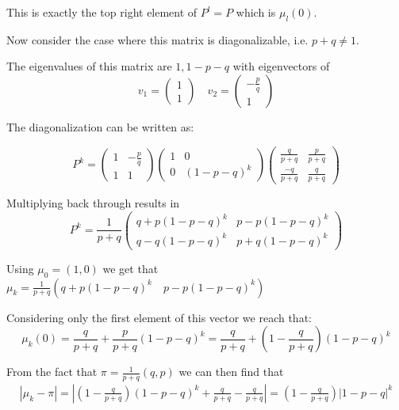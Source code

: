 \documentclass[12pt]{paper}
\newcommand{\abs}[1]{\left \lvert #1 \right \rvert}
\begin{document}
This is exactly the top right element of $P^l = P$ which is $\mu_l(0)$.

\vspace{.2in}

Now consider the case where this matrix is diagonalizable, i.e. $p+q \neq
1$.

\vspace{.2in}

The eigenvalues of this matrix are $1,1-p-q$ with eigenvectors of
\begin{equation*}
  v_1 =
  \begin{pmatrix}
    1\\
    1
  \end{pmatrix}
  \quad v_2 =
  \begin{pmatrix}
    -\frac{p}{q}\\
    1
  \end{pmatrix}
\end{equation*}

The diagonalization can be written as:

\begin{equation*}
  P^k =
  \begin{pmatrix}
    1 & -\frac{p}{q}\\
    1 & 1
  \end{pmatrix}
  \begin{pmatrix}
    1 & 0\\
    0 & (1-p-q)^k
  \end{pmatrix}
  \begin{pmatrix}
    \frac{q}{p+q} & \frac{p}{p+q}\\
    \frac{-q}{p+q} & \frac{q}{p+q}
  \end{pmatrix}
\end{equation*}

Multiplying back through results in
\begin{equation*}
  P^k = \frac{1}{p+q}
  \begin{pmatrix}
    q + p(1-p-q)^k & p - p(1-p-q)^k\\
    q - q(1-p-q)^k &p + q(1-p-q)^k
  \end{pmatrix}
\end{equation*}

Using $\mu_0 = (1,0)$ we get that $\mu_k = \frac{1}{p+q} (q + p(1-p-q)^k \quad
p - p(1-p-q)^k)$

Considering only the first element of this vector we reach that:
\begin{equation*}
  \mu_k(0) = \frac{q}{p+q} + \frac{p}{p+q} (1-p-q)^k = \frac{q}{p+q} +
  \left( 1 - \frac{q}{p+q} \right) (1-p-q)^k
\end{equation*}


From the fact that $\pi = \frac{1}{p+q} (q,p)$ we can then find that
\begin{align*}
  \abs{\mu_k -\pi} = \abs{ \left( 1 - \frac{q}{p+q} \right) (1-p-q)^k +
  \frac{q}{p+q} - \frac{q}{p+q} } = \left( 1 - \frac{q}{p+q} \right) \abs{1-p-q}^k
\end{align*}
\end{document}
